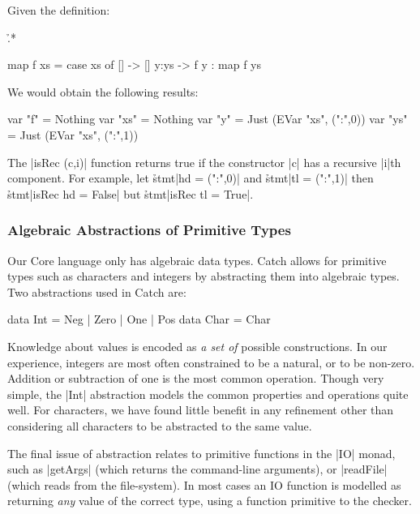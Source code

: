 \begin{example}
Given the definition:

\h{.*}\begin{code}
map f xs = case  xs of
                 []    -> []
                 y:ys  -> f y : map f ys
\end{code}

We would obtain the following results:

\begin{code}
var "f"   = Nothing
var "xs"  = Nothing
var "y"   = Just (EVar "xs", (":",0))
var "ys"  = Just (EVar "xs", (":",1))
\end{code}
\end{example}

The |isRec (c,i)| function returns true if the constructor |c| has a recursive |i|th component. For example, let \h{stmt}|hd = (":",0)| and \h{stmt}|tl = (":",1)| then \h{stmt}|isRec hd = False| but \h{stmt}|isRec tl = True|. 

\subsubsection{Algebraic Abstractions of Primitive Types}
\label{secC:abstraction}

Our Core language only has algebraic data types. Catch allows for primitive types such as characters and integers by abstracting them into algebraic types. Two abstractions used in Catch are:

\ignore\begin{code}
data Int = Neg | Zero | One | Pos
data Char = Char
\end{code}

Knowledge about values is encoded as \textit{a set of} possible constructions. In our experience, integers are most often constrained to be a natural, or to be non-zero. Addition or subtraction of one is the most common operation. Though very simple, the |Int| abstraction models the common properties and operations quite well. For characters, we have found little benefit in any refinement other than considering all characters to be abstracted to the same value.

The final issue of abstraction relates to primitive functions in the |IO| monad, such as |getArgs| (which returns the command-line arguments), or |readFile| (which reads from the file-system). In most cases an IO function is modelled as returning \textit{any} value of the correct type, using a function primitive to the checker.


